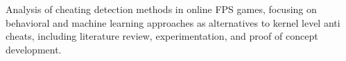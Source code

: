 Analysis of cheating detection methods in online FPS games, focusing on behavioral and machine learning approaches as alternatives to kernel level anti cheats, including literature review, experimentation, and proof of concept development.